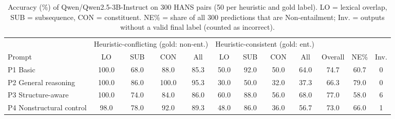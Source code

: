 \begin{table}[t]
\centering
\small
\begin{tabular}{l cccc cccc c c c}
\toprule
 & \multicolumn{4}{c}{Heuristic-conflicting (gold: non-ent.)} & \multicolumn{4}{c}{Heuristic-consistent (gold: ent.)} & & & \\
\cmidrule(lr){2-5}\cmidrule(lr){6-9}
Prompt & LO & SUB & CON & All & LO & SUB & CON & All & Overall & NE\% & Inv. \\
\midrule
P1 Basic & 100.0 & 68.0 & 88.0 & 85.3 & 50.0 & 92.0 & 50.0 & 64.0 & 74.7 & 60.7 & 0 \\
P2 General reasoning & 100.0 & 86.0 & 100.0 & 95.3 & 30.0 & 50.0 & 32.0 & 37.3 & 66.3 & 79.0 & 0 \\
P3 Structure-aware & 100.0 & 74.0 & 84.0 & 86.0 & 60.0 & 88.0 & 56.0 & 68.0 & 77.0 & 58.0 & 6 \\
P4 Nonstructural control & 98.0 & 78.0 & 92.0 & 89.3 & 48.0 & 86.0 & 36.0 & 56.7 & 73.0 & 66.0 & 1 \\
\bottomrule
\end{tabular}
\caption{Accuracy (\%) of Qwen/Qwen2.5-3B-Instruct on 300 HANS pairs (50 per heuristic and gold label). LO = lexical overlap, SUB = subsequence, CON = constituent. NE\% = share of all 300 predictions that are Non-entailment; Inv. = outputs without a valid final label (counted as incorrect).}
\label{tab:main}
\end{table}
